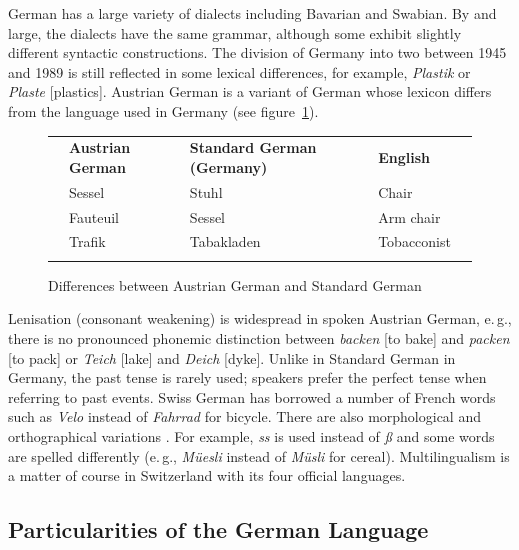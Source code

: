 \documentclass[]{../../metanetpaper}
\begin{document}
\begin{multicols}{2}

German has a large variety of dialects including Bavarian and Swabian. By and large, the dialects have the same grammar, although some exhibit slightly different syntactic constructions. The division of Germany into two between 1945 and 1989 is still reflected in some lexical differences, for example, \textit{Plastik} or \textit{Plaste} {[}plastics{]}. Austrian German is a variant of German whose lexicon differs from the language used in Germany (see figure~\ref{atgetabelle2_en}).

\begin{figure}[htb]
  \setlength{\tabcolsep}{2em}
  \begin{tabularx}{\textwidth}{lllll} \toprule\addlinespace
    & \textbf{Austrian German} & \textbf{Standard German (Germany)} & \textbf{English} & \\ \addlinespace\midrule\addlinespace
    & Sessel   & Stuhl      & Chair & \\ 
    & Fauteuil & Sessel     & Arm chair & \\ 
    & Trafik   & Tabakladen & Tobacconist & \\ \addlinespace\bottomrule
  \end{tabularx}
  \caption{Differences between Austrian German and Standard German}
  \label{atgetabelle2_en}
\end{figure}

Lenisation (consonant weakening) is widespread in spoken Austrian German, e.\,g., there is no pronounced phonemic distinction between \textit{backen} {[}to bake{]} and \textit{packen} {[}to pack{]} or \textit{Teich} {[}lake{]} and \textit{Deich} {[}dyke{]}. Unlike in Standard German in Germany, the past tense is rarely used; speakers prefer the perfect tense when referring to past events.
Swiss German has borrowed a number of French words such as \textit{Velo} instead of \textit{Fahrrad} for bicycle. There are also morphological and orthographical variations \cite{Cano1}. For example, \textit{ss} is used instead of \textit{ß} and some words are spelled differently (e.\,g., \textit{Müesli} instead of \textit{Müsli} for cereal). Multilingualism is a matter of course in Switzerland with its four official languages.

\subsection{Particularities of the German Language}


\end{multicols}
\end{document}

